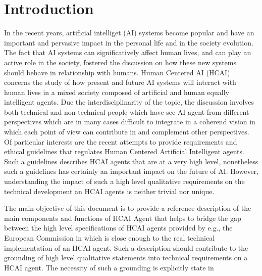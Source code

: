 \section{Introduction}




In the recent years, artificial intelliget (AI) systems become popular
and have an important and pervasive impact in the personal life and in
the society evolution.  The fact that AI systems can significatively
affect human lives, and can play an active role in the society,
fostered the discussion on how these new systems should behave in
relationship with humans.  Human Centered AI (HCAI) concerns the study
of how present and future AI systems will interact with human lives in
a mixed society composed of artificial and human equally intelligent
agents.
Due the interdisciplinarity of the topic, the discussion involves both
technical and non technical people which have see AI agent from
different perspectives which are in many cases difficult to integrate
in a coherend vision in which each point of view can contribute in and
complement other perspectives.
Of particular interests are the recent attempts to provide
requirements and ethical guidelines that regulates Human Centered
Artificial Intelligent agents. Such a guidelines describes HCAI agents
that are at a very high level, nonetheless such a guidelines has
certainly an important impact on the future of AI. However,
understanding the impact of such a high level qualitative requirements
on the technical development an HCAI agents is neither trivial nor
unique.

The main objective of this document is to provide a reference
description of the main components and functions of HCAI Agent that
helps to bridge the gap between the high level specifications of HCAI
agents provided by e.g., the European Commission in
\cite{eu-ethical-guidelines} which is close enough to the real
technical implementation of an HCAI agent.
Such a description should contribute to the grounding of high level
qualitative statements into technical requirements on a HCAI agent.
The necessity of such a grounding is explicitly state in

